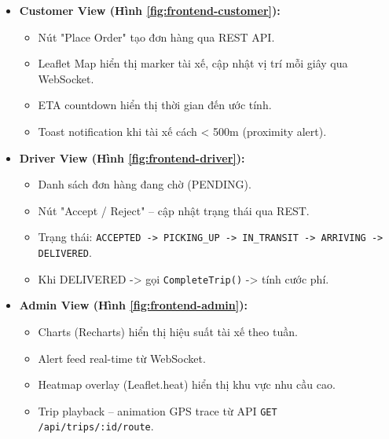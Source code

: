 \bigskip
\begin{itemize}
    \item \textbf{Customer View (Hình \ref{fig:frontend-customer}):}
    \begin{itemize}
        \item Nút "Place Order" tạo đơn hàng qua REST API.
        \item Leaflet Map hiển thị marker tài xế, cập nhật vị trí mỗi giây qua WebSocket.
        \item ETA countdown hiển thị thời gian đến ước tính.
        \item Toast notification khi tài xế cách < 500m (proximity alert).
    \end{itemize}

    \item \textbf{Driver View (Hình \ref{fig:frontend-driver}):}
    \begin{itemize}
        \item Danh sách đơn hàng đang chờ (PENDING).
        \item Nút "Accept / Reject" -- cập nhật trạng thái qua REST.
        \item Trạng thái: \texttt{ACCEPTED -\textgreater{} PICKING\_UP -\textgreater{} IN\_TRANSIT -\textgreater{} ARRIVING -\textgreater{} DELIVERED}.
        \item Khi DELIVERED -\textgreater{} gọi \texttt{CompleteTrip()} -\textgreater{} tính cước phí.
    \end{itemize}

    \item \textbf{Admin View (Hình \ref{fig:frontend-admin}):}
    \begin{itemize}
        \item Charts (Recharts) hiển thị hiệu suất tài xế theo tuần.
        \item Alert feed real-time từ WebSocket.
        \item Heatmap overlay (Leaflet.heat) hiển thị khu vực nhu cầu cao.
        \item Trip playback -- animation GPS trace từ API \texttt{GET /api/trips/:id/route}.
    \end{itemize}
\end{itemize}

